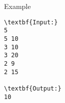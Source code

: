 Example
\begin{verbatim}
\textbf{Input:}
5
5 10
3 10
3 20
2 9
2 15

\textbf{Output:}
10
\end{verbatim}